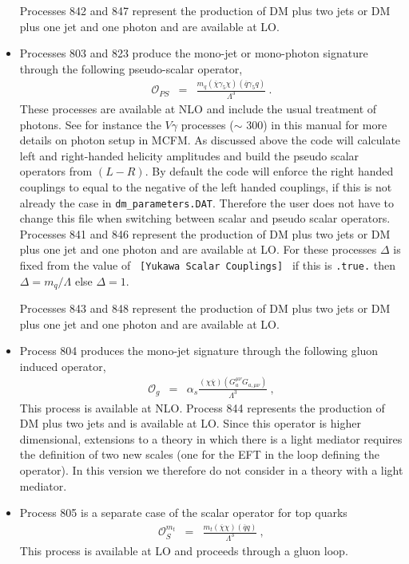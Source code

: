 \begin{itemize}
Processes 842 and 847 represent the production of DM plus two jets or DM plus one jet and one photon and are available 
at LO. 
\item 
Processes 803 and 823 produce the 
mono-jet or mono-photon signature through the following pseudo-scalar operator, 
\begin{eqnarray}
\mathcal{O}_{PS}&=&\frac{m_q(\overline{\chi}\gamma_5\chi)(\overline{q}\gamma_5q)}{\Lambda^3}\label{eq:OPS}~.
\end{eqnarray}
These processes are available at NLO and include the usual treatment
of photons. See for instance the $V\gamma$ processes ($\sim$ 300) in
this manual for more details on photon setup in MCFM. As discussed
above the code will calculate left and right-handed helicity
amplitudes and build the pseudo scalar operators from $(L-R)$. By
default the code will enforce the right handed couplings to equal to
the negative of the left handed couplings, if this is not
already the case in {\tt dm\_parameters.DAT}. Therefore the user does
not have to change this file when switching between scalar and pseudo
scalar operators.  Processes 841 and 846 represent the production of
DM plus two jets or DM plus one jet and one photon and are available
at LO.  For these processes $\Delta$ is fixed from the value of {\tt
  [Yukawa Scalar Couplings] } if this is {\tt .true.} then
$\Delta=m_q/\Lambda$ else $\Delta=1$.

Processes 843 and 848 represent the production of DM plus two jets or DM plus one jet and one photon and are available 
at LO. 

\item 
Process 804 produces the 
mono-jet signature through the following gluon induced operator, 
\begin{eqnarray}
\mathcal{O}_g&=&\alpha_s\frac{(\chi\overline{\chi})(G^{\mu\nu}_aG_{a,\mu\nu})}{\Lambda^3}~,
\end{eqnarray}
This process is available at NLO. Process 844 represents the
production of DM plus two jets and is available at LO. Since this
operator is higher dimensional, extensions to a theory in which there
is a light mediator requires the definition of two new scales (one for
the EFT in the loop defining the operator). In this version we
therefore do not consider in a theory with a light mediator.
\item 
Process 805 is a separate case of the scalar operator for top quarks
\begin{eqnarray}
\mathcal{O}^{m_t}_S&=&\frac{m_t(\overline{\chi}\chi)(\overline{q}q)}{\Lambda^3}~,
\end{eqnarray}
This process is available at LO and proceeds through a gluon loop. 
\end{itemize}
